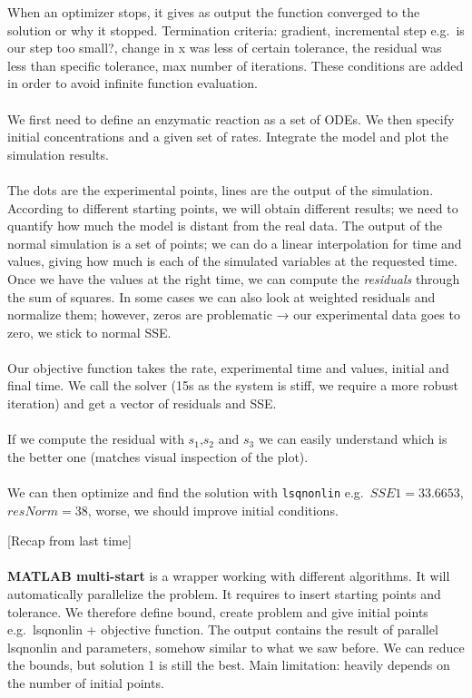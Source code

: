 When an optimizer stops, it gives as output the function converged to
the solution or why it stopped. Termination criteria: gradient,
incremental step e.g.~is our step too small?, change in x was less of
certain tolerance, the residual was less than specific tolerance, max
number of iterations. These conditions are added in order to avoid
infinite function evaluation.
\\
\\
\noindent
We first need to define an enzymatic reaction as a set of ODEs. We then
specify initial concentrations and a given set of rates. Integrate the
model and plot the simulation results.
\\
\\
\noindent
The dots are the experimental points, lines are the output of the
simulation. According to different starting points, we will obtain
different results; we need to quantify how much the model is distant
from the real data. The output of the normal simulation is a set of
points; we can do a linear interpolation for time and values, giving how
much is each of the simulated variables at the requested time. Once we
have the values at the right time, we can compute the \emph{residuals}
through the sum of squares. In some cases we can also look at weighted
residuals and normalize them; however, zeros are problematic → our
experimental data goes to zero, we stick to normal SSE.
\\
\\
\noindent
Our objective function takes the rate, experimental time and values,
initial and final time. We call the solver (15s as the system is stiff,
we require a more robust iteration) and get a vector of residuals and
SSE.
\\
\\
\noindent
If we compute the residual with $s_1$,$s_2$ and $s_3$ we can easily understand
which is the better one (matches visual inspection of the plot).
\\
\\
\noindent
We can then optimize and find the solution with \texttt{lsqnonlin}
e.g.~$SSE1 = 33.6653$, $resNorm = 38$, worse, we should improve initial
conditions.

{[}Recap from last time{]}
\\
\\
\noindent
\textbf{MATLAB multi-start} is a wrapper working with different
algorithms. It will automatically parallelize the problem. It requires
to insert starting points and tolerance. We therefore define bound,
create problem and give initial points e.g.~lsqnonlin + objective
function. The output contains the result of parallel lsqnonlin and
parameters, somehow similar to what we saw before. We can reduce the
bounds, but solution 1 is still the best. Main limitation: heavily
depends on the number of initial points.

